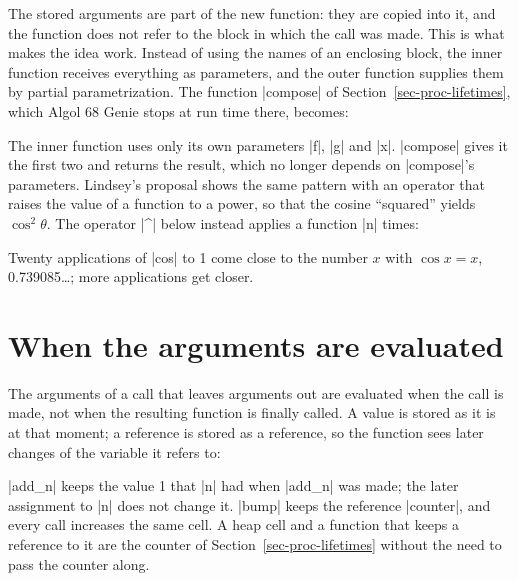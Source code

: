 The stored arguments are part of the new function: they are copied into
it, and the function does not refer to the block in which the call was
made. This is what makes the idea work. Instead of using the names of an
enclosing block, the inner function receives everything as parameters,
and the outer function supplies them by partial parametrization. The
function \code|compose| of Section~\ref{sec-proc-lifetimes}, which Algol
68 Genie stops at run time there, becomes:


\noindent The inner function uses only its own parameters
\code|f|, \code|g| and \code|x|. \code|compose| gives it the first two and
returns the result, which no longer depends on \code|compose|'s
parameters. Lindsey's proposal shows the same pattern with an operator
that raises the value of a function to a power, so that the cosine
``squared'' yields $\cos^2\theta$. The operator \code|^| below instead
applies a function \code|n| times:


\noindent Twenty applications of \code|cos| to 1 come close to the
number $x$ with $\cos x = x$, 0.739085\ldots; more applications get
closer.

\section*{When the arguments are evaluated}

The arguments of a call that leaves arguments out are evaluated when the call is made, not
when the resulting function is finally called. A value is stored as it
is at that moment; a reference is stored as a reference, so the function
sees later changes of the variable it refers to:


\noindent \code|add_n| keeps the value 1 that \code|n| had when
\code|add_n| was made; the later assignment to \code|n| does not change
it. \code|bump| keeps the reference \code|counter|, and every call
increases the same cell. A heap cell and a function that keeps a
reference to it are the counter of Section~\ref{sec-proc-lifetimes}
without the need to pass the counter along.

